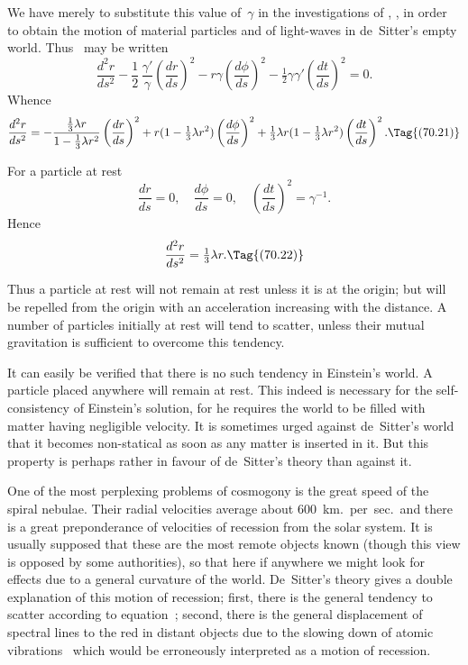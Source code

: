 \documentclass[12pt]{book}
\begin{document}
We have merely to substitute this value of~$\gamma$ in the investigations of
, , in order to obtain the motion of material particles and of light-waves
in de~Sitter's empty world. Thus ~may be written
\[
\frac{d^{2}r}{ds^{2}}
  - \frac{1}{2}\, \frac{\gamma'}{\gamma} \left(\frac{dr}{ds}\right)^{2}
  - r\gamma \left(\frac{d\phi}{ds}\right)^{2}
  - \tfrac{1}{2}\gamma\gamma' \left(\frac{dt}{ds}\right)^{2} = 0.
\]
Whence
\[
\frac{d^{2}r}{ds^{2}}
  = -\frac{\frac{1}{3}\lambda r}{1 - \frac{1}{3}\lambda r^{2}} \left(\frac{dr}{ds}\right)^{2}
  + r(1 - \tfrac{1}{3}\lambda r^{2}) \left(\frac{d\phi}{ds}\right)^{2}
  + \tfrac{1}{3}\lambda r(1 - \tfrac{1}{3}\lambda r^{2}) \left(\frac{dt}{ds}\right)^{2}.
  \Tag{(70.21)}
\]

For a particle at rest
\[
\frac{dr}{ds} = 0,\quad
\frac{d\phi}{ds} = 0,\quad
\left(\frac{dt}{ds}\right)^{2} = \gamma^{-1}.
\]
Hence
\[
\frac{d^{2}r}{ds^{2}} = \tfrac{1}{3}\lambda r.
\Tag{(70.22)}
\]

Thus a particle at rest will not remain at rest unless it is at the origin;
but will be repelled from the origin with an acceleration increasing with the
distance. A number of particles initially at rest will tend to scatter, unless
their mutual gravitation is sufficient to overcome this tendency.

It can easily be verified that there is no such tendency in Einstein's world.
A particle placed anywhere will remain at rest. This indeed is necessary for
the self-consistency of Einstein's solution, for he requires the world to be
filled with matter having negligible velocity. It is sometimes urged against
de~Sitter's world that it becomes non-statical as soon as any matter is inserted
in it. But this property is perhaps rather in favour of de~Sitter's theory than
against it.

One of the most perplexing problems of cosmogony is the great speed of
the spiral nebulae. Their radial velocities average about $600$~km.\ per~sec.\ and
there is a great preponderance of velocities of recession from the solar system.
It is usually supposed that these are the most remote objects known (though
this view is opposed by some authorities), so that here if anywhere we might
look for effects due to a general curvature of the world. De~Sitter's theory
gives a double explanation of this motion of recession; first, there is the
general tendency to scatter according to equation~; second, there is
the general displacement of spectral lines to the red in distant objects due to
%
the slowing down of atomic vibrations~ which would be erroneously interpreted
as a motion of recession.
\end{document}

